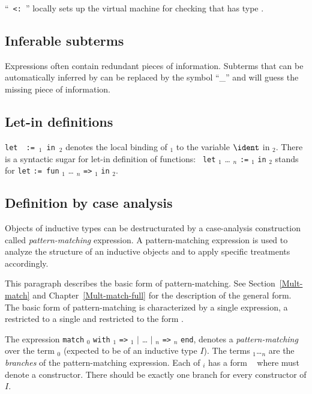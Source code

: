 ``{\term}~{\tt <:}~{\type}'' locally sets up the virtual machine for checking
that {\term} has type {\type}.

\subsection{Inferable subterms
\label{hole}
\index{\_}}

Expressions often contain redundant pieces of information. Subterms that
can be automatically inferred by {\Coq} can be replaced by the
symbol ``\_'' and {\Coq} will guess the missing piece of information.

\subsection{Let-in definitions
\label{let-in}
}


{\tt let}~{\ident}~{\tt :=}~{\term$_1$}~{\tt in}~{\term$_2$} denotes
the local binding of \term$_1$ to the variable $\ident$ in
\term$_2$. 
There is a syntactic sugar for let-in definition of functions: {\tt
let} {\ident} {\binder$_1$} {\ldots} {\binder$_n$} {\tt :=} {\term$_1$}
{\tt in} {\term$_2$} stands for {\tt let} {\ident} {\tt := fun}
{\binder$_1$} {\ldots} {\binder$_n$} {\tt =>} {\term$_1$} {\tt in}
{\term$_2$}.

\subsection{Definition by case analysis
\label{caseanalysis}
}

Objects of inductive types can be destructurated by a case-analysis
construction called {\em pattern-matching} expression.  A
pattern-matching expression is used to analyze the structure of an
inductive objects and to apply specific treatments accordingly.

This paragraph describes the basic form of pattern-matching. See
Section~\ref{Mult-match} and Chapter~\ref{Mult-match-full} for the
description of the general form. The basic form of pattern-matching is
characterized by a single {\caseitem} expression, a {\multpattern}
restricted to a single {\pattern} and {\pattern} restricted to the
form {\qualid} \nelist{\ident}{}.

The expression {\tt match} {\term$_0$} {\returntype} {\tt with}
{\pattern$_1$} {\tt =>} {\term$_1$} {\tt $|$} {\ldots} {\tt $|$}
{\pattern$_n$} {\tt =>} {\term$_n$} {\tt end}, denotes a {\em
pattern-matching} over the term {\term$_0$} (expected to be of an
inductive type $I$).  The terms {\term$_1$}\ldots{\term$_n$} are the
{\em branches} of the pattern-matching expression. Each of
{\pattern$_i$} has a form \qualid~\nelist{\ident}{} where {\qualid}
must denote a constructor. There should be exactly one branch for
every constructor of $I$.

